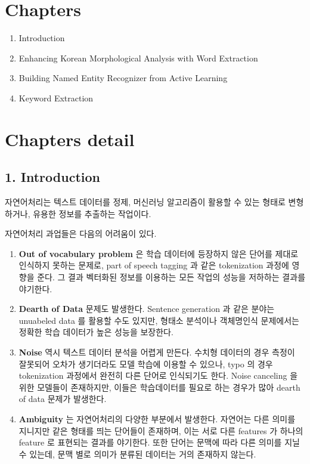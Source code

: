 \documentclass[11pt]{article}
\begin{document}
\section{Chapters}

\begin{enumerate}
    \item Introduction
    \item Enhancing Korean Morphological Analysis with Word Extraction
    \item Building Named Entity Recognizer from Active Learning
    \item Keyword Extraction
\end{enumerate}

\section{Chapters detail}

\subsection*{1. Introduction}

자연어처리는 텍스트 데이터를 정제, 머신러닝 알고리즘이 활용할 수 있는 형태로 변형하거나, 유용한 정보를 추출하는 작업이다.

자연어처리 과업들은 다음의 어려움이 있다.

\begin{enumerate}
    \item \textbf{Out of vocabulary problem} 은 학습 데이터에 등장하지 않은 단어를 제대로 인식하지 못하는 문제로, part of speech tagging 과 같은 tokenization 과정에 영향을 준다. 그 결과 벡터화된 정보를 이용하는 모든 작업의 성능을 저하하는 결과를 야기한다.
    \item \textbf{Dearth of Data} 문제도 발생한다. Sentence generation 과 같은 분야는 unuabeled data 를 활용할 수도 있지만, 형태소 분석이나 객체명인식 문제에서는 정확한 학습 데이터가 높은 성능을 보장한다.
    \item \textbf{Noise} 역시 텍스트 데이터 분석을 어렵게 만든다. 수치형 데이터의 경우 측정이 잘못되어 오차가 생기더라도 모델 학습에 이용할 수 있으나, typo 의 경우 tokenization 과정에서 완전히 다른 단어로 인식되기도 한다. Noise canceling 을 위한 모델들이 존재하지만, 이들은 학습데이터를 필요로 하는 경우가 많아 dearth of data 문제가 발생한다.
    \item \textbf{Ambiguity} 는 자연어처리의 다양한 부분에서 발생한다. 자연어는 다른 의미를 지니지만 같은 형태를 띄는 단어들이 존재하며, 이는 서로 다른 features 가 하나의 feature 로 표현되는 결과를 야기한다. 또한 단어는 문맥에 따라 다른 의미를 지닐 수 있는데, 문맥 별로 의미가 분류된 데이터는 거의 존재하지 않는다.
\end{enumerate}
\end{document}
